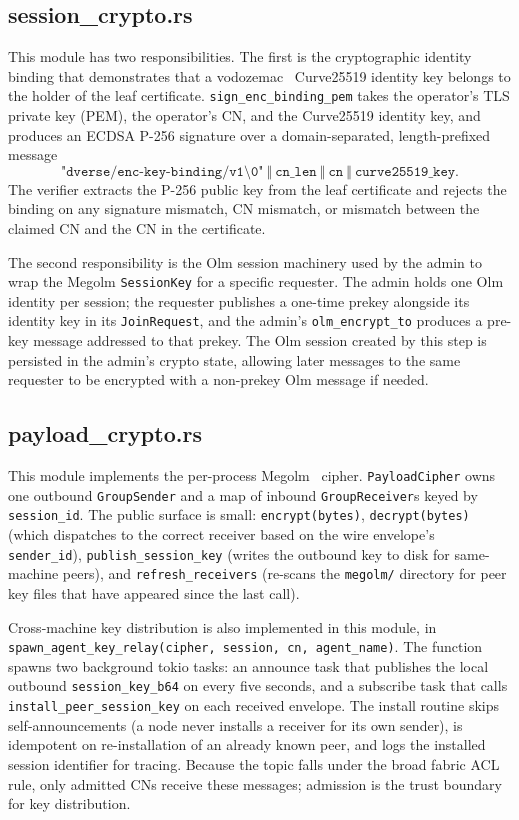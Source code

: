\documentclass[11pt,a4paper]{article}
\begin{document}
\subsection{session\_crypto.rs}

This module has two responsibilities. The first is the
cryptographic identity binding that demonstrates that a
vodozemac~\citep{vodozemac} Curve25519 identity key belongs to
the holder of the leaf certificate.
\texttt{sign\_enc\_binding\_pem} takes the operator's TLS private
key (PEM), the operator's CN, and the Curve25519 identity key,
and produces an ECDSA P-256 signature over a domain-separated,
length-prefixed message
\[
  \texttt{"dverse/enc-key-binding/v1\textbackslash 0"}
  \ \Vert\ \texttt{cn\_len}
  \ \Vert\ \texttt{cn}
  \ \Vert\ \texttt{curve25519\_key}.
\]
The verifier extracts the P-256 public key from the leaf
certificate and rejects the binding on any signature mismatch, CN
mismatch, or mismatch between the claimed CN and the CN in the
certificate.

The second responsibility is the Olm session machinery used by
the admin to wrap the Megolm \texttt{SessionKey} for a specific
requester. The admin holds one Olm identity per session; the
requester publishes a one-time prekey alongside its identity key
in its \texttt{JoinRequest}, and the admin's
\texttt{olm\_encrypt\_to} produces a pre-key message addressed to
that prekey. The Olm session created by this step is persisted in
the admin's crypto state, allowing later messages to the same
requester to be encrypted with a non-prekey Olm message if needed.

\subsection{payload\_crypto.rs}

This module implements the per-process Megolm~\citep{megolmspec}
cipher. \texttt{PayloadCipher} owns one outbound
\texttt{GroupSender} and a map of inbound
\texttt{GroupReceiver}s keyed by \texttt{session\_id}. The
public surface is small: \texttt{encrypt(bytes)},
\texttt{decrypt(bytes)} (which dispatches to the correct receiver
based on the wire envelope's \texttt{sender\_id}),
\texttt{publish\_session\_key} (writes the outbound key to disk
for same-machine peers), and \texttt{refresh\_receivers}
(re-scans the \texttt{megolm/} directory for peer key files that
have appeared since the last call).

Cross-machine key distribution is also implemented in this
module, in
\texttt{spawn\_agent\_key\_relay(cipher, session, cn, agent\_name)}.
The function spawns two background tokio tasks: an announce task
that publishes the local outbound \texttt{session\_key\_b64} on
 every five seconds,
and a subscribe task that calls \texttt{install\_peer\_session\_key}
on each received envelope. The install routine skips
self-announcements (a node never installs a receiver for its own
sender), is idempotent on re-installation of an already known
peer, and logs the installed session identifier for tracing.
Because the topic falls under the broad fabric ACL rule, only
admitted CNs receive these messages; admission is the trust
boundary for key distribution.
\end{document}
